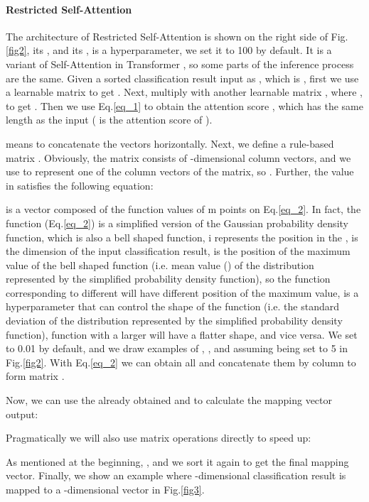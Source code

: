 \documentclass{article}
\begin{document}
\paragraph{Restricted Self-Attention}
The architecture of Restricted Self-Attention is shown on the right side of Fig.\ref{fig2}, its , and its ,  is a hyperparameter, we set it to 100 by default. It is a variant of Self-Attention in Transformer \cite{vaswani2017attention}, so some parts of the inference process are the same. Given a sorted classification result input as , which is , first we use a learnable matrix  to get . Next, multiply  with another learnable matrix , where , to get . Then we use Eq.\ref{eq_1} to obtain the attention score , which has the same length as the input  ( is the attention score of ).


 means to concatenate the vectors horizontally. Next, we define a rule-based matrix . Obviously, the matrix consists of  -dimensional column vectors, and we use  to represent one of the column vectors of the matrix, so . Further, the value in  satisfies the following equation:

 is a vector composed of the function values of m points on Eq.\ref{eq_2}. In fact, the function (Eq.\ref{eq_2}) is a simplified version of the Gaussian probability density function, which is also a bell shaped function, i represents the position in the ,  is the dimension of the input classification result,  is the position of the maximum value of the bell shaped function (i.e. mean value () of the distribution represented by the simplified probability density function), so the function corresponding to different  will have different position of the maximum value,  is a hyperparameter that can control the shape of the function (i.e. the standard deviation of the distribution represented by the simplified probability density function), function with a larger  will have a flatter shape, and vice versa. We set  to 0.01 by default, and we draw examples of , , and  assuming  being set to 5 in Fig.\ref{fig2}. With Eq.\ref{eq_2} we can obtain all   and concatenate them by column to form matrix  .


Now, we can use the already obtained  and  to calculate the mapping vector output:


Pragmatically we will also use matrix operations directly to speed up:


As mentioned at the beginning, , and we sort it again to get the final mapping vector. Finally, we show an example where -dimensional classification result is mapped to a -dimensional vector in Fig.\ref{fig3}.
\end{document}
